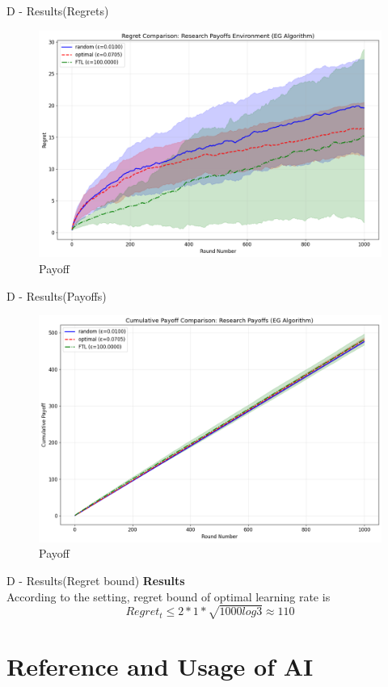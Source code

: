 \documentclass{beamer}
\begin{document}
\begin{frame}{D - Results(Regrets)}
\begin{figure}
    \centering
    \includegraphics[width=0.5\linewidth]{332Project2/figures/RP_regret.png}
    \caption{Payoff}
    \label{fig:placeholder}
\end{figure}
    
\end{frame}

\begin{frame}{D - Results(Payoffs)}
\begin{figure}
    \centering
    \includegraphics[width=0.5\linewidth]{332Project2/figures/RP_payoff.png}
    \caption{Payoff}
    \label{fig:placeholder}
\end{figure}
    
\end{frame}

\begin{frame}{D - Results(Regret bound)}
\textbf{Results}\\
    According to the setting, regret bound of optimal learning rate is
    \[
    Regret_t \leq 2 * 1 * \sqrt{1000log3} \approx 110
    \]
\end{frame}

\section{Reference and Usage of AI}
\end{document}
